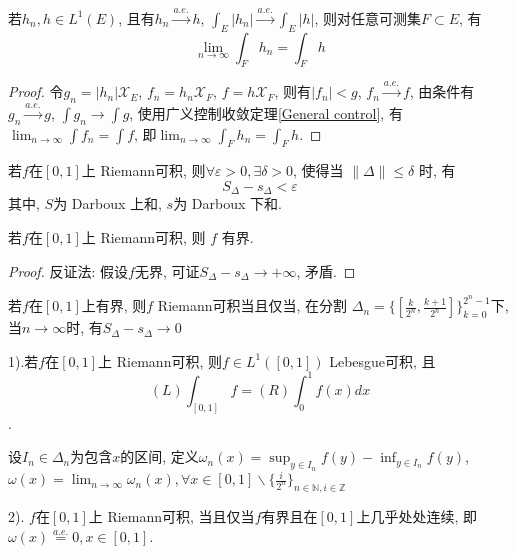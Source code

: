 \documentclass[12pt, a4paper, oneside, UTF8]{ctexbook}  %
\begin{document}
\begin{corollary}
    若$h_n, h\in L^1(E)$, 且有$h_n \stackrel{a.e.}{\rightarrow} h$,
     $\int_{E}|h_n|\stackrel{a.e.}{\rightarrow} \int_{E}|h|$, 则对任意可测集$F\subset E$, 有
     $$ \lim_{n\to \infty}\int_{F}h_n = \int_{F} h$$
\end{corollary}

\begin{proof}
    令$g_n = |h_n|\mathcal{X}_E $, $f_n = h_n\mathcal{X}_F$, $f = h\mathcal{X}_F$, 则有$|f_n|<g$, 
    $f_n \stackrel{a.e.}{\rightarrow} f$, 由条件有$g_n \stackrel{a.e.}{\rightarrow} g$, 
    $\int g_n \rightarrow \int g$, 使用广义控制收敛定理\ref{General control}, 
    有$\lim_{n\to\infty}\int f_n = \int f$, 即$\lim_{n\to\infty}\int_{F}h_n = \int_F h$.
\end{proof}


\begin{thm}
    若$f$在$[0, 1]$上 Riemann可积, 则$\forall \varepsilon>0, \exists \delta >0$, 使得当 $\| \Delta\| \leq \delta$ 时, 有
    $$ S_\Delta - s_\Delta < \varepsilon $$
    其中, $S$为 Darboux 上和, $s$为 Darboux 下和.
\end{thm}


\begin{thm}
    若$f$在$[0, 1]$上 Riemann可积, 则 $f$ 有界.
\end{thm}

\begin{proof}
    反证法: 假设$f$无界, 可证$S_\Delta - s_\Delta \rightarrow +\infty$, 矛盾.
\end{proof}


\begin{thm}
    若$f$在$[0, 1]$上有界, 则$f$ Riemann可积当且仅当, 在分割
    $\Delta_n = \{ [\frac{k}{2^n}, \frac{k+1}{2^n}] \}_{k=0}^{2^n-1}$下, 当$n\to\infty$时, 有$S_\Delta - s_\Delta \to 0$
\end{thm}

\begin{thm}
    1).若$f$在$[0, 1]$上 Riemann可积, 则$f\in L^1([0, 1])$ Lebesgue可积, 且
    $$(L)\int_{[0, 1]}f = (R)\int_0^1f(x)dx$$.

    设$I_n\in \Delta_n$为包含$x$的区间, 定义$\omega_n(x) = \sup_{y\in I_n}f(y) - \inf_{y\in I_n}f(y)$, 
    $\omega(x) = \lim_{n\to\infty}\omega_n(x), \forall x \in [0, 1]\backslash  
    \{ \frac{i}{2^n}\}_{n\in \mathbb{N}, i\in \mathbb{Z}}$
    \par 2). $f$在$[0, 1]$上 Riemann可积, 当且仅当$f$有界且在$[0, 1]$上几乎处处连续, 即
    $\omega(x)\stackrel{a.e.}{=}0, x\in [0, 1]$. 
\end{thm}
\end{document}
